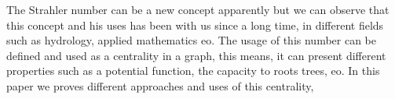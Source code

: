 The Strahler number can be a new concept apparently but we can observe that this concept and his uses has been with us since a long time, in different fields such as hydrology, applied mathematics eo. The usage of this number can be defined and used as a centrality in a graph, this means, it can present different properties such as a potential function, the capacity to roots trees, eo. In this paper we proves different approaches and uses of this centrality,  
